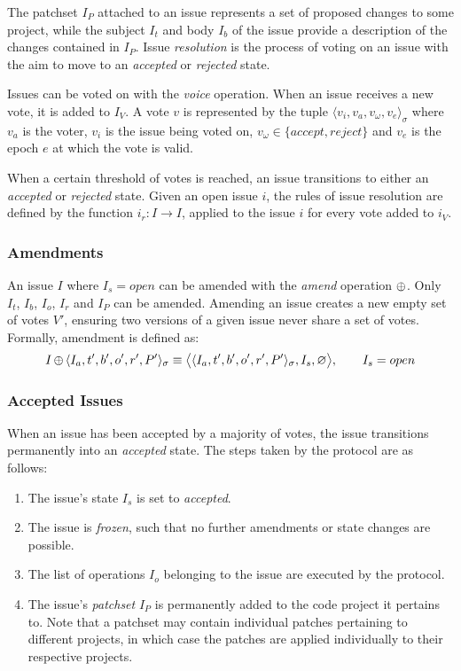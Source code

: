 The patchset $I_P$ attached to an issue represents a set of proposed changes to
some project, while the subject $I_t$ and body $I_b$ of the issue provide a
description of the changes contained in $I_P$. Issue \emph{resolution} is the
process of voting on an issue with the aim to move to an \emph{accepted} or
\emph{rejected} state.

Issues can be voted on with the \emph{voice} operation. When an issue receives
a new vote, it is added to $I_V$. A vote $v$ is represented by the tuple
$\langle v_i, v_a, v_{\omega}, v_e \rangle_{\sigma}$ where $v_a$ is the voter,
$v_i$ is the issue being voted on, $v_{\omega} \in \{accept, reject\}$ and
$v_e$ is the epoch $e$ at which the vote is valid.

When a certain threshold of votes is reached, an issue transitions to either an
\emph{accepted} or \emph{rejected} state. Given an open issue $i$, the rules of
issue resolution are defined by the function $i_r : I \to I$, applied to the
issue $i$ for every vote added to $i_V$.

\subsubsection{Amendments}

An issue $I$ where $I_s = open$ can be amended with the \emph{amend} operation
$\operatorname{\oplus}$. Only $I_t$, $I_b$, $I_o$, $I_r$ and $I_P$ can be amended.  Amending an issue creates
a new empty set of votes $V'$, ensuring two versions of a given issue never
share a set of votes. Formally, amendment is defined as:
\begin{align*}
    I \operatorname{\oplus}{} \langle I_a, t', b', o', r', P' \rangle_{\sigma} \equiv
    \big<\langle I_a, t', b', o', r', P' \rangle_{\sigma}, I_s, \varnothing
    \big>, \qquad I_s = open
\end{align*}


\subsubsection{Accepted Issues} When an issue has been accepted by a majority
of votes, the issue transitions permanently into an \emph{accepted} state. The
steps taken by the protocol are as follows:

\begin{enumerate}
    \item The issue's state $I_s$ is set to \emph{accepted}.
    \item The issue is \emph{frozen}, such that no further amendments or state
        changes are possible.
    \item The list of operations $I_o$ belonging to the issue are executed by
        the protocol.
    \item The issue's \emph{patchset} $I_P$ is permanently added to the code
        project it pertains to. Note that a patchset may contain individual
        patches pertaining to different projects, in which case the patches are
        applied individually to their respective projects.
\end{enumerate}

